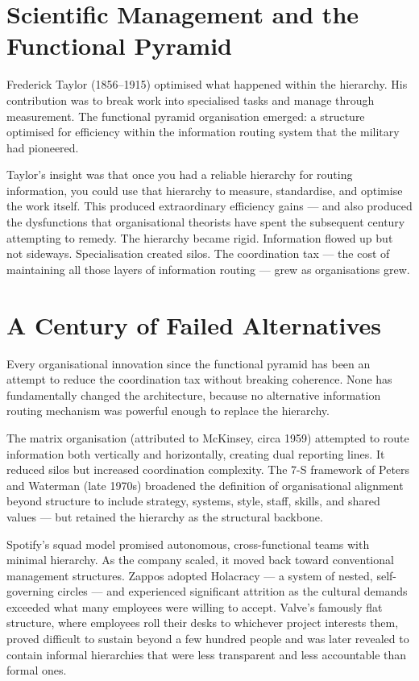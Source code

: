 \section{Scientific Management and the Functional Pyramid}

Frederick Taylor (1856--1915) optimised what happened within the hierarchy. His contribution was to break work into specialised tasks and manage through measurement. The functional pyramid organisation emerged: a structure optimised for efficiency within the information routing system that the military had pioneered.

Taylor's insight was that once you had a reliable hierarchy for routing information, you could use that hierarchy to measure, standardise, and optimise the work itself. This produced extraordinary efficiency gains --- and also produced the dysfunctions that organisational theorists have spent the subsequent century attempting to remedy. The hierarchy became rigid. Information flowed up but not sideways. Specialisation created silos. The coordination tax --- the cost of maintaining all those layers of information routing --- grew as organisations grew.

\section{A Century of Failed Alternatives}

\begin{evidencebox}
Every organisational innovation since the functional pyramid has been an attempt to reduce the coordination tax without breaking coherence. None has fundamentally changed the architecture, because no alternative information routing mechanism was powerful enough to replace the hierarchy.
\end{evidencebox}

The matrix organisation (attributed to McKinsey, circa 1959) attempted to route information both vertically and horizontally, creating dual reporting lines. It reduced silos but increased coordination complexity. The 7-S framework of Peters and Waterman (late 1970s) broadened the definition of organisational alignment beyond structure to include strategy, systems, style, staff, skills, and shared values --- but retained the hierarchy as the structural backbone.

Spotify's squad model promised autonomous, cross-functional teams with minimal hierarchy. As the company scaled, it moved back toward conventional management structures. Zappos adopted Holacracy --- a system of nested, self-governing circles --- and experienced significant attrition as the cultural demands exceeded what many employees were willing to accept. Valve's famously flat structure, where employees roll their desks to whichever project interests them, proved difficult to sustain beyond a few hundred people and was later revealed to contain informal hierarchies that were less transparent and less accountable than formal ones.

